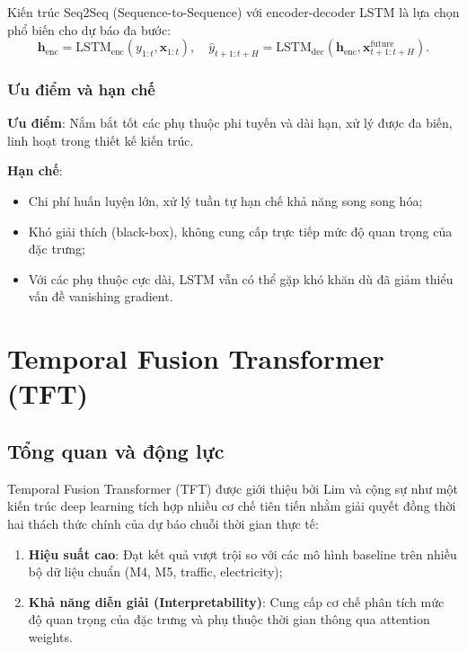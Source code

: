 Kiến trúc Seq2Seq (Sequence-to-Sequence) với encoder-decoder LSTM \citep{sutskever2014sequence} là lựa chọn phổ biến cho dự báo đa bước:
\begin{equation}
    \mathbf{h}_{\text{enc}} = \text{LSTM}_{\text{enc}}(y_{1:t}, \mathbf{x}_{1:t}), \quad
    \hat{y}_{t+1:t+H} = \text{LSTM}_{\text{dec}}(\mathbf{h}_{\text{enc}}, \mathbf{x}^{\text{future}}_{t+1:t+H}).
    \label{eq:seq2seq}
\end{equation}

\subsubsection{Ưu điểm và hạn chế}

\textbf{Ưu điểm}: Nắm bắt tốt các phụ thuộc phi tuyến và dài hạn, xử lý được đa biến, linh hoạt trong thiết kế kiến trúc.

\textbf{Hạn chế}:
\begin{itemize}
    \item Chi phí huấn luyện lớn, xử lý tuần tự hạn chế khả năng song song hóa;
    \item Khó giải thích (black-box), không cung cấp trực tiếp mức độ quan trọng của đặc trưng;
    \item Với các phụ thuộc cực dài, LSTM vẫn có thể gặp khó khăn dù đã giảm thiểu vấn đề vanishing gradient.
\end{itemize}

\section{Temporal Fusion Transformer (TFT)}
\label{sec:tft}

\subsection{Tổng quan và động lực}
\label{subsec:tft_tong_quan}

Temporal Fusion Transformer (TFT) được giới thiệu bởi Lim và cộng sự \citep{lim2021temporal} như một kiến trúc deep learning tích hợp nhiều cơ chế tiên tiến nhằm giải quyết đồng thời hai thách thức chính của dự báo chuỗi thời gian thực tế:

\begin{enumerate}
    \item \textbf{Hiệu suất cao}: Đạt kết quả vượt trội so với các mô hình baseline trên nhiều bộ dữ liệu chuẩn (M4, M5, traffic, electricity);
    \item \textbf{Khả năng diễn giải (Interpretability)}: Cung cấp cơ chế phân tích mức độ quan trọng của đặc trưng và phụ thuộc thời gian thông qua attention weights.
\end{enumerate}

